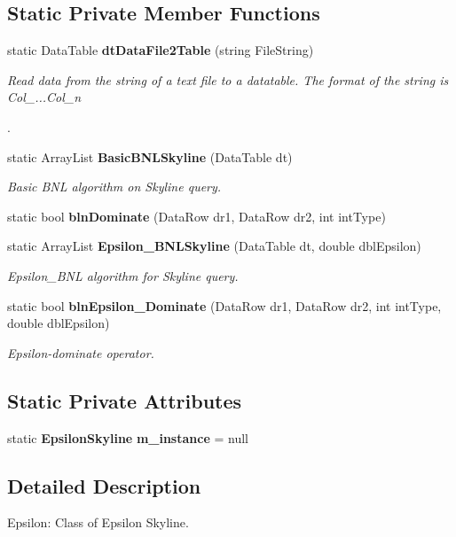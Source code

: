 \subsection*{Static Private Member Functions}
\begin{CompactItemize}
\item 
static Data\-Table {\bf dt\-Data\-File2Table} (string File\-String)
\begin{CompactList}\small\item\em Read data from the string of a text file to a datatable. The format of the string is Col\_...Col\_\-n\par
. \item\end{CompactList}\item 
static Array\-List {\bf Basic\-BNLSkyline} (Data\-Table dt)
\begin{CompactList}\small\item\em Basic BNL algorithm on Skyline query. \item\end{CompactList}\item 
static bool {\bf bln\-Dominate} (Data\-Row dr1, Data\-Row dr2, int int\-Type)
\item 
static Array\-List {\bf Epsilon\_\-BNLSkyline} (Data\-Table dt, double dbl\-Epsilon)
\begin{CompactList}\small\item\em Epsilon\_\-BNL algorithm for Skyline query. \item\end{CompactList}\item 
static bool {\bf bln\-Epsilon\_\-Dominate} (Data\-Row dr1, Data\-Row dr2, int int\-Type, double dbl\-Epsilon)
\begin{CompactList}\small\item\em Epsilon-dominate operator. \item\end{CompactList}\end{CompactItemize}
\subsection*{Static Private Attributes}
\begin{CompactItemize}
\item 
static {\bf Epsilon\-Skyline} {\bf m\_\-instance} = null
\end{CompactItemize}


\subsection{Detailed Description}
Epsilon: Class of Epsilon Skyline. 

